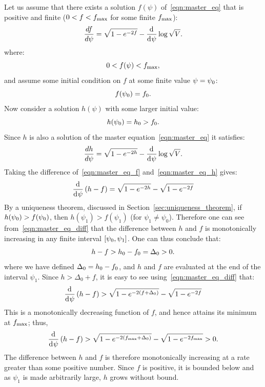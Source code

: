 Let us assume that there exists a solution \(f(\psi)\) of~\eqref{eqn:master_eq} that is positive and finite (\(0<f<f_\mathrm{max}\) for some finite \(f_\mathrm{max}\)):
%
\begin{equation}
  \frac{d f}{d \psi} = \sqrt{1-e^{-2f}} -\frac{\operatorname{d}^{}\!{}}{\operatorname{d}^{}\!{\psi}}\log \sqrt V.
  \label{eqn:master_eq_f}
\end{equation}
%
where:
%
\begin{equation}
  0<f(\psi)<f_\mathrm{max},
\end{equation}
%
and assume some initial condition on \(f\) at some finite value
\(\psi=\psi_0\):
%
\begin{equation}
  f(\psi_0)=f_0.
\end{equation}
%
Now consider a solution \(h(\psi)\) with some larger initial value:
%
\begin{equation}
  h(\psi_0)=h_0>f_0.
\end{equation}
%
Since \(h\) is also a solution of the master equation~\eqref{eqn:master_eq} it satisfies:
%
\begin{equation}
  \frac{d h}{d \psi} = \sqrt{1-e^{-2h}} -\frac{\operatorname{d}^{}\!{}}{\operatorname{d}^{}\!{\psi}}\log \sqrt V.
  \label{eqn:master_eq_h}
\end{equation}
%
Taking the difference of~\eqref{eqn:master_eq_f} and~\eqref{eqn:master_eq_h} gives:
%
\begin{equation}
  \frac{\operatorname{d}^{}\!{}}{\operatorname{d}^{}\!{\psi}}\left(h-f\right)
  = 
  \sqrt{1-e^{-2h}}-\sqrt{1-e^{-2f}}
  \label{eqn:master_eq_diff}
\end{equation}
%
By a uniqueness theorem, discussed in Section~\ref{sec:uniqueness_theorem}, if \(h(\psi_0)>f(\psi_0)\), then \(h(\psi_1)>f(\psi_1)\) (for \(\psi_1\ne\psi_0\)). Therefore one can see from~\eqref{eqn:master_eq_diff} that the difference between \(h\) and \(f\) is monotonically increasing in any finite interval \([\psi_0,\psi_1]\).  One can thus conclude that:
%
\begin{equation}
  h-f>h_0-f_0=\Delta_0>0.
  \label{eqn:cosh_rel}
\end{equation}
%
where we have defined \(\Delta_0 = h_0-f_0\), and \(h\) and \(f\) are evaluated at the end of the interval \(\psi_1\). Since \(h>\Delta_0+f\), it is easy to see using~\eqref{eqn:master_eq_diff} that:
%
\begin{equation}
  \frac{\operatorname{d}^{}\!{}}{\operatorname{d}^{}\!{\psi}}\left(h-f\right)
  > 
  \sqrt{1-e^{-2(f+\Delta_0)}}-\sqrt{1-e^{-2f}}
\end{equation}
%
This is a monotonically decreasing function of \(f\), and hence attains its minimum at \(f_\mathrm{max}\); thus,
%
\begin{equation}
  \frac{\operatorname{d}^{}\!{}}{\operatorname{d}^{}\!{\psi}}\left(h-f\right)
  > 
  \sqrt{1-e^{-2(f_\mathrm{max}+\Delta_0)}}-\sqrt{1-e^{-2f_\mathrm{max}}} 
  >
  0.
\end{equation}
%
The difference between \(h\) and \(f\) is therefore monotonically increasing at a rate greater than some positive number. Since \(f\) is positive, it is bounded below and as \(\psi_1\) is made arbitrarily large, \(h\) grows without bound.

